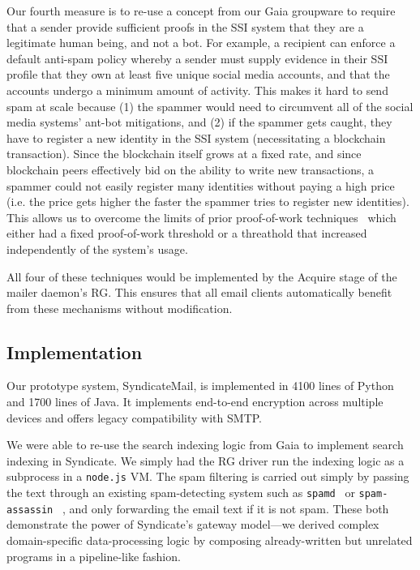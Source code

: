 Our fourth measure is to re-use a concept from our Gaia groupware to require
that a sender provide sufficient proofs in the SSI system that they are a
legitimate human being, and not a bot.  For example, a recipient can enforce a
default anti-spam policy whereby a sender must supply evidence in their SSI
profile that they own at least five unique social media accounts, and that the
accounts undergo a minimum amount of activity.  This makes it hard to send
spam at scale because (1) the spammer would need to circumvent all of the social
media systems' ant-bot mitigations, and (2) if the spammer gets caught, they
have to register a new identity in the SSI system (necessitating a blockchain
transaction).  Since the blockchain itself grows at a fixed rate, and since
blockchain peers effectively bid on the ability to write new transactions, a
spammer could not easily register many identities without paying a high price
(i.e. the price gets higher the faster the spammer tries to register new
identities).  This allows us to overcome the limits of prior proof-of-work
techniques~\cite{anti-spam-proof-of-work} which either had a fixed proof-of-work
threshold or a threathold that increased independently of the system's usage.

All four of these techniques would be implemented by the Acquire stage of the
mailer daemon's RG.  This ensures that all email clients automatically benefit
from these mechanisms without modification.

\subsection{Implementation}

Our prototype system, SyndicateMail, is implemented in 4100 lines of Python and
1700 lines of Java.  It implements end-to-end encryption across multiple devices
and offers legacy compatibility with SMTP.

We were able to re-use the search indexing
logic from Gaia to implement search indexing in Syndicate.  We simply had the RG
driver run the indexing logic as a subprocess in a \texttt{node.js} VM.  The
spam filtering is carried out simply by passing the text through an existing
spam-detecting system such as \texttt{spamd}~\cite{spamd} or \texttt{spam-assassin}
~\cite{spam-assassin}, and only forwarding the email text if it is not spam.
These both demonstrate the power of Syndicate's gateway model---we 
derived complex domain-specific data-processing logic by composing
already-written but unrelated programs in a pipeline-like fashion.


